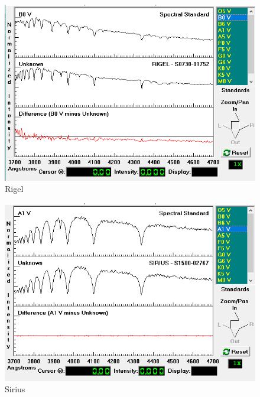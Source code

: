 \documentclass[letterpaper,11pt]{report}
\begin{document}
    \begin{figure}[H]
        \centering
        \includegraphics[scale=0.4]{Rigel.png}
        \caption{Rigel}
        \label{fig:my_label}
    \end{figure}
    
    \begin{figure}[H]
        \centering
        \includegraphics[scale=0.4]{Sirius.png}
        \caption{Sirius}
        \label{fig:my_label}
    \end{figure}
    
\end{document}
